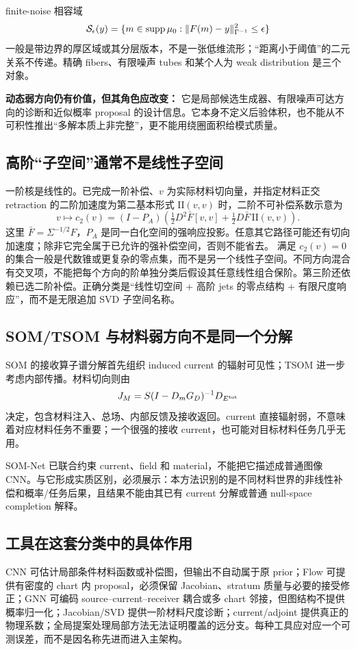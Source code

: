 finite-noise 相容域
\[
\mathcal S_\epsilon(y)=
\{m\in\operatorname{supp}\mu_0:\|F(m)-y\|_{\Gamma^{-1}}^2\le\epsilon\}
\]
一般是带边界的厚区域或其分层版本，不是一张低维流形；“距离小于阈值”的二元关系不传递。精确 fibers、有限噪声 tubes 和某个人为 weak distribution 是三个对象。

\textbf{动态弱方向仍有价值，但其角色应改变：} 它是局部候选生成器、有限噪声可达方向的诊断和近似概率 proposal 的设计信息。它本身不定义后验体积，也不能从不可积性推出“多解本质上非完整”，更不能用绕圈面积给模式质量。

\subsection{高阶“子空间”通常不是线性子空间}
一阶核是线性的。已完成一阶补偿、$v$ 为实际材料切向量，并指定材料正交 retraction 的二阶加速度为第二基本形式 $\mathrm{II}(v,v)$ 时，二阶不可补偿系数示意为
\[
v\longmapsto c_2(v)=(I-P_A)\left(
\tfrac12D^2\bar F[v,v]+\tfrac12D\bar F\,\mathrm{II}(v,v)\right).
\]
这里 $\bar F=\Sigma^{-1/2}F$，$P_A$ 是同一白化空间的强响应投影。任意其它路径可能还有切向加速度；除非它完全属于已允许的强补偿空间，否则不能省去。
满足 $c_2(v)=0$ 的集合一般是代数锥或更复杂的零点集，而不是另一个线性子空间。不同方向混合有交叉项，不能把每个方向的阶单独分类后假设其任意线性组合保阶。第三阶还依赖已选二阶补偿。正确分类是“线性切空间 + 高阶 jets 的零点结构 + 有限尺度响应”，而不是无限追加 SVD 子空间名称。

\subsection{SOM/TSOM 与材料弱方向不是同一个分解}
SOM 的接收算子谱分解首先组织 induced current 的辐射可见性；TSOM 进一步考虑内部传播。材料切向则由
\[
J_M=S(I-D_mG_D)^{-1}D_{E^{\rm tot}}
\]
决定，包含材料注入、总场、内部反馈及接收返回。current 直接辐射弱，不意味着对应材料任务不重要；一个很强的接收 current，也可能对目标材料任务几乎无用。

SOM-Net 已联合约束 current、field 和 material，不能把它描述成普通图像 CNN。与它形成实质区别，必须展示：本方法识别的是不同材料世界的非线性补偿和概率/任务后果，且结果不能由其已有 current 分解或普通 null-space completion 解释。

\subsection{工具在这套分类中的具体作用}
CNN 可估计局部条件材料函数或补偿图，但输出不自动属于原 prior；Flow 可提供有密度的 chart 内 proposal，必须保留 Jacobian、stratum 质量与必要的接受修正；GNN 可编码 source--current--receiver 耦合或多 chart 邻接，但图结构不提供概率归一化；Jacobian/SVD 提供一阶材料尺度诊断；current/adjoint 提供真正的物理系数；全局提案处理局部方法无法证明覆盖的远分支。每种工具应对应一个可测误差，而不是因名称先进而进入主架构。

